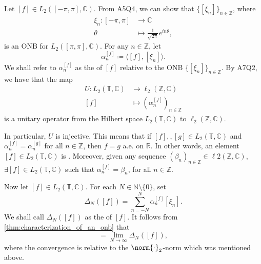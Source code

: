 \documentclass[notoc,notitlepage]{tufte-book}
\begin{document}
\begin{eg}\label{eg:fourier_for_bigl2_in_complex_unit_circle}
  Let $[f] \in L_2([-\pi, \pi], \mathbb{C})$.
  From A5Q4, we can show that $\{ [ \xi_n ] \}_{n \in \mathbb{Z}}$,
  where
  \begin{align*}
    \xi_n : [-\pi, \pi] &\to \mathbb{C} \\
        \theta &\mapsto \frac{1}{\sqrt{2 \pi}} e^{in \theta},
  \end{align*}
  is an ONB for $L_2([\pi, \pi], \mathbb{C})$.
  For any $n \in \mathbb{Z}$, let
  \begin{equation*}
    \alpha_n^{[f]} \coloneqq \langle [f], [\xi_n] \rangle.
  \end{equation*}
  We shall refer to $\alpha_n^{[f]}$ as the
   of $[f]$
  relative to the ONB $\{ [\xi_n] \}_{n \in \mathbb{Z}}$.
  By A7Q2, we have that the map
  \begin{align*}
    U : L_2(\mathbb{T}, \mathbb{C}) &\to \ell_2(\mathbb{Z}, \mathbb{C}) \\
        [f] &\mapsto \left( \alpha_{n}^{[f]} \right)_{ n \in \mathbb{Z} }
  \end{align*}
  is a unitary operator from the Hilbert space
  $L_2(\mathbb{T}, \mathbb{C})$ to $\ell_2(\mathbb{Z}, \mathbb{C})$.

  In particular, $U$ is injective.
  This means that if $[f],, [g] \in L_2(\mathbb{T}, \mathbb{C})$
  and $\alpha_n^{[f]} = \alpha_n^{[g]}$ for all $n \in \mathbb{Z}$,
  then $f = g$ a.e. on $\mathbb{R}$.
  In other words, an element $[f] \in L_2(\mathbb{T}, \mathbb{C})$
  is .
  Moreover, given any sequence $(\beta_n)_{n \in \mathbb{Z}}
  \in \ell2(\mathbb{Z}, \mathbb{C})$, $\exists [f] \in L_2(\mathbb{T}, \mathbb{C})$
  such that $\alpha_n^{[f]} = \beta_n$, for all $n \in \mathbb{Z}$.

  Now let $[f] \in L_2(\mathbb{T}, \mathbb{C})$.
  For each $N \in \mathbb{N} \setminus \{ 0 \}$, set
  \begin{equation*}
    \Delta_N([f]) = \sum_{n = -N}^{N} \alpha_n^{[f]} [\xi_n].
  \end{equation*}
  We shall call $\Delta_N([f])$ as the
   of $[f]$.
  It follows from \cref{thm:characterization_of_an_onb} that
  \begin{equation*}
    [f] = \lim_{N \to \infty} \Delta_N([f]),
  \end{equation*}
  where the convergence is relative to the $\norm{\cdot}_2$-norm
  which was mentioned above.
\end{eg}
\end{document}
